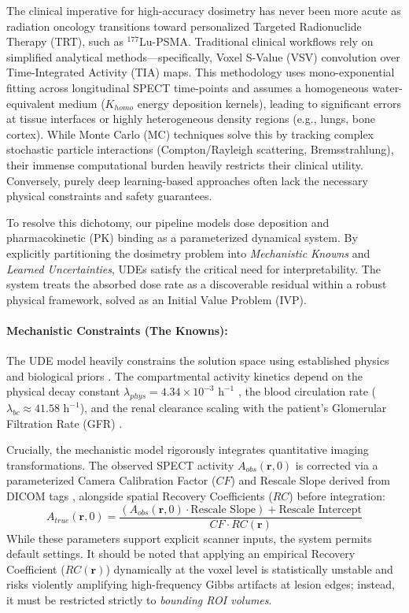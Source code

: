 \documentclass[10pt,letterpaper]{article}
\begin{document}
The clinical imperative for high-accuracy dosimetry has never been more acute as radiation oncology transitions toward personalized Targeted Radionuclide Therapy (TRT), such as $^{177}$Lu-PSMA. Traditional clinical workflows rely on simplified analytical methods---specifically, Voxel S-Value (VSV) convolution over Time-Integrated Activity (TIA) maps. This methodology uses mono-exponential fitting across longitudinal SPECT time-points and assumes a homogeneous water-equivalent medium ($K_{homo}$ energy deposition kernels), leading to significant errors at tissue interfaces or highly heterogeneous density regions (e.g., lungs, bone cortex). While Monte Carlo (MC) techniques solve this by tracking complex stochastic particle interactions (Compton/Rayleigh scattering, Bremsstrahlung), their immense computational burden heavily restricts their clinical utility. Conversely, purely deep learning-based approaches often lack the necessary physical constraints and safety guarantees.

To resolve this dichotomy, our pipeline models dose deposition and pharmacokinetic (PK) binding as a parameterized dynamical system. By explicitly partitioning the dosimetry problem into \textit{Mechanistic Knowns} and \textit{Learned Uncertainties}, UDEs satisfy the critical need for interpretability. The system treats the absorbed dose rate as a discoverable residual within a robust physical framework, solved as an Initial Value Problem (IVP).

\paragraph{Mechanistic Constraints (The Knowns):}
The UDE model heavily constrains the solution space using established physics and biological priors \cite{KennedyLugassi2020}. The compartmental activity kinetics depend on the physical decay constant $\lambda_{phys} = 4.34 \times 10^{-3} \text{ h}^{-1}$ \cite{ReschFouladgar2023, StabinMadsen2019}, the blood circulation rate ($\lambda_{bc} \approx 41.58 \text{ h}^{-1}$), and the renal clearance scaling with the patient's Glomerular Filtration Rate (GFR) \cite{HardiansyahYousefzadehNowshahr2024}.

Crucially, the mechanistic model rigorously integrates quantitative imaging transformations. The observed SPECT activity $A_{obs}(\mathbf{r}, 0)$ is corrected via a parameterized Camera Calibration Factor ($CF$) and Rescale Slope derived from DICOM tags \cite{BidgoodHorii1992, GleisnerChouin2022}, alongside spatial Recovery Coefficients ($RC$) \cite{KlettingSchimmel2015} before integration:
\begin{equation}
    A_{true}(\mathbf{r}, 0) = \frac{\left( A_{obs}(\mathbf{r}, 0) \cdot \text{Rescale Slope} \right) + \text{Rescale Intercept}}{CF \cdot RC(\mathbf{r})}
\end{equation}
While these parameters support explicit scanner inputs, the system permits default settings. It should be noted that applying an empirical Recovery Coefficient ($RC(\mathbf{r})$) dynamically at the voxel level is statistically unstable and risks violently amplifying high-frequency Gibbs artifacts at lesion edges; instead, it must be restricted strictly to \textit{bounding ROI volumes}.
\end{document}
